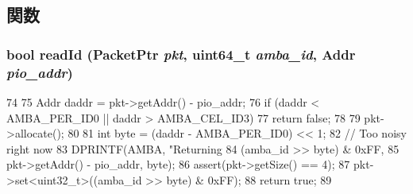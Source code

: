 \subsection{関数}
\hypertarget{classAmbaDevice_a071939342677d0c85870b8f65d8f7639}{
\subsubsection[{readId}]{\setlength{\rightskip}{0pt plus 5cm}bool readId ({\bf PacketPtr} {\em pkt}, \/  uint64\_\-t {\em amba\_\-id}, \/  {\bf Addr} {\em pio\_\-addr})}}
\label{classAmbaDevice_a071939342677d0c85870b8f65d8f7639}



\begin{DoxyCode}
74 {
75     Addr daddr = pkt->getAddr() - pio_addr;
76     if (daddr < AMBA_PER_ID0 || daddr > AMBA_CEL_ID3)
77         return false;
78 
79     pkt->allocate();
80 
81     int byte = (daddr - AMBA_PER_ID0) << 1;
82     // Too noisy right now
83     DPRINTF(AMBA, "Returning %
84             (amba_id >> byte) & 0xFF,
85             pkt->getAddr() - pio_addr, byte);
86     assert(pkt->getSize() == 4);
87     pkt->set<uint32_t>((amba_id >> byte) & 0xFF);
88     return true;
89 }
\end{DoxyCode}


